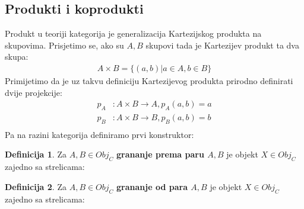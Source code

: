 \documentclass[11pt]{article}
\theoremstyle{definition}
\newtheorem{definition}{Definicija}
\begin{document}
  \subsection{Produkti i koprodukti}
  Produkt u teoriji kategorija je generalizacija Kartezijskog produkta na
  skupovima. Prisjetimo se, ako su $A, B$ skupovi tada je Kartezijev produkt ta
  dva skupa:
  \begin{align*}
    A \times B = \{ (a, b) | a \in A, b \in B\}
  \end{align*}
  Primijetimo da je uz takvu definiciju Kartezijevog produkta prirodno
  definirati dvije projekcije:
  \begin{align*}
    p_A &: A \times B \to A, p_A(a, b) = a\\
    p_B &: A \times B \to B, p_B(a, b) = b\\
  \end{align*}
  Pa na razini kategorija definiramo prvi konstruktor:
  \begin{definition}
    Za $A, B \in Obj_C$ \textbf{grananje prema paru $A, B$} je objekt $X \in
    Obj_C$
    zajedno sa strelicama:
  \begin{center}
  \end{center}
  \end{definition}
  \begin{definition}
    Za $A, B \in Obj_C$ \textbf{grananje od para $A, B$} je objekt $X \in
    Obj_C$
    zajedno sa strelicama:
  \begin{center}
  \end{center}
  \end{definition}
\end{document}
